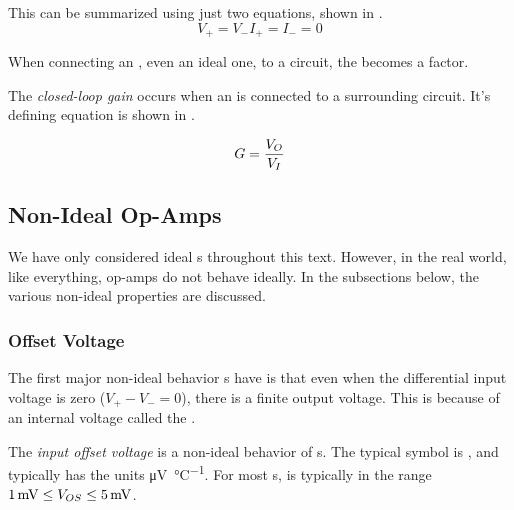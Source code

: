 This can be summarized using just two equations, shown in .
\begin{subequations}
  \begin{equation}\label{eq:Ideal_Op-Amp-Voltage}
    V_{+} = V_{-}
  \end{equation}
  \begin{equation}\label{eq:Ideal_Op-Amp-Current}
    I_{+} = I_{-} = 0
  \end{equation}
\end{subequations}

When connecting an , even an ideal one, to a circuit, the  becomes a factor.

\begin{definition}\label{def:Closed-Loop_Gain}
  The \emph{closed-loop gain} occurs when an  is connected to a surrounding circuit.
  It's defining equation is shown in .

  \begin{equation}\label{eq:Closed-Loop_Gain}
    G = \frac{V_{O}}{V_{I}}
  \end{equation}
\end{definition}

\subsection{Non-Ideal Op-Amps}\label{subsec:Non-Ideal_Op-Amps}
We have only considered ideal s throughout this text.
However, in the real world, like everything, op-amps do not behave ideally.
In the subsections below, the various non-ideal properties are discussed.

\subsubsection{Offset Voltage}\label{subsubsec:Offset_Voltage}
The first major non-ideal behavior s have is that even when the differential input voltage is zero ($V_{+} - V_{-} = 0$), there is a finite output voltage.
This is because of an internal voltage called the .

\begin{definition}\label{def:Input_Offset_Voltage}
  The \emph{input offset voltage} is a non-ideal behavior of s.
  The typical symbol is , and typically has the units \si{\micro\volt\per\degreeCelsius}.
  For most s,  is typically in the range $\SI{1}{\milli\volt} \leq V_{OS} \leq \SI{5}{\milli\volt}$.
\end{definition}

